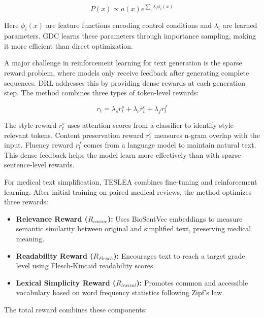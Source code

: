 \begin{equation}
P(x) \propto a(x) e^{\sum_i \lambda_i \phi_i(x)}
\end{equation}

Here $\phi_i(x)$ are feature functions encoding control conditions and $\lambda_i$ are learned parameters. 
GDC learns these parameters through importance sampling, making it more efficient than direct optimization.

A major challenge in reinforcement learning for text generation is the sparse reward problem, where models only receive feedback after generating complete sequences. 
DRL \cite{upadhyay2022efficientreinforcementlearningunsupervised} addresses this by providing dense rewards at each generation step. The method combines three types of token-level rewards:

\begin{equation}
r_t = \lambda_s r_t^s + \lambda_c r_t^c + \lambda_f r_t^f
\end{equation}

The style reward $r_t^s$ uses attention scores from a classifier to identify style-relevant tokens. 
Content preservation reward $r_t^c$ measures n-gram overlap with the input. 
Fluency reward $r_t^f$ comes from a language model to maintain natural text. 
This dense feedback helps the model learn more effectively than with sparse sentence-level rewards.

For medical text simplification, TESLEA \cite{info:doi/10.2196/38095} combines fine-tuning and reinforcement learning. After initial training on paired medical reviews, the method optimizes three rewards:

\begin{itemize}
    \item \textbf{Relevance Reward ($R_{cosine}$):} Uses BioSentVec embeddings \cite{Chen_2019} to measure semantic similarity between original and simplified text, preserving medical meaning.
    
    \item \textbf{Readability Reward ($R_{Flesch}$):} Encourages text to reach a target grade level using Flesch-Kincaid readability scores.
    
    \item \textbf{Lexical Simplicity Reward ($R_{lexical}$):} Promotes common and accessible vocabulary based on word frequency statistics following Zipf's law.
\end{itemize}

The total reward combines these components:

